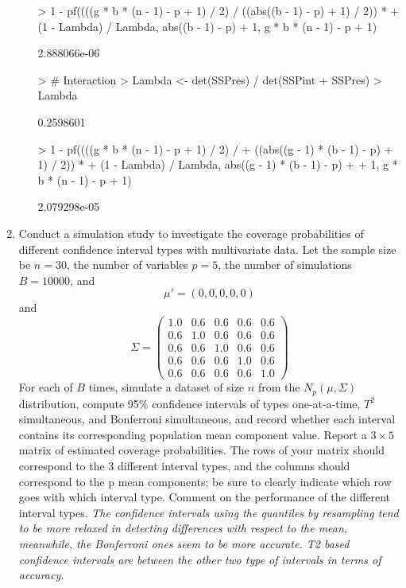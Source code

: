 \documentclass[12pt,a4paper]{paper}
\begin{document}
\begin{enumerate}
\begin{enumerate}
\begin{Schunk}
\begin{Sinput}
> 1 - pf((((g * b * (n - 1) - p + 1) / 2) / ((abs((b - 1) - p) + 1) / 2)) * 
+   (1 - Lambda) / Lambda, abs((b - 1) - p) + 1, g * b * (n - 1) - p + 1)
\end{Sinput}
\begin{Soutput}
[1] 2.888066e-06
\end{Soutput}
\begin{Sinput}
> # Interaction
> Lambda <- det(SSPres) / det(SSPint + SSPres)
> Lambda
\end{Sinput}
\begin{Soutput}
[1] 0.2598601
\end{Soutput}
\begin{Sinput}
> 1 - pf((((g * b * (n - 1) - p + 1) / 2) / 
+           ((abs((g - 1) * (b - 1) - p) + 1) / 2)) * 
+   (1 - Lambda) / Lambda, abs((g - 1) * (b - 1) - p) + 
+     1, g * b * (n - 1) - p + 1)
\end{Sinput}
\begin{Soutput}
[1] 2.079298e-05
\end{Soutput}
\end{Schunk}
\end{enumerate}
\item Conduct a simulation study to investigate the coverage probabilities of different confidence
interval types with multivariate data. Let the sample size be $n = 30$, the number of variables $p = 5$, the number of simulations $B = 10000$, and \[\mu' =\left(0, 0, 0, 0, 0\right)\] and \[\Sigma = \left(\begin{array}{ccccc}1.0&0.6&0.6&0.6&0.6\\0.6&1.0&0.6&0.6&0.6\\0.6&0.6&1.0&0.6&0.6\\0.6&0.6&0.6&1.0&0.6\\0.6&0.6&0.6&0.6&1.0\end{array}\right)\] For each of $B$ times, simulate a dataset of size $n$ from the $N_{p}\left(\mu,\Sigma\right)$ distribution, compute 95\% confidence intervals of types one-at-a-time, $T^{2}$ simultaneous, and Bonferroni simultaneous, and record whether each interval contains its corresponding population mean component value. Report a $3 \times 5$ matrix of estimated coverage probabilities. The rows of your matrix should correspond to the 3 different interval types, and the columns should correspond to the p mean components; be sure to clearly indicate which row goes with which interval type. Comment on the performance of the different interval types. \textit{The confidence intervals using the quantiles by resampling tend to be more relaxed in detecting differences with respect to the mean, meanwhile, the Bonferroni ones seem to be more accurate. T2 based confidence intervals are between the other two type of intervals in terms of accuracy.}

\end{enumerate}
\end{document}
